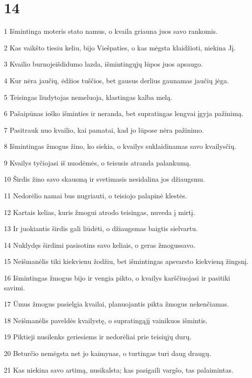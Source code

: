 \chapter{14}


\par 1 Išmintinga moteris stato namus, o kvaila griauna juos savo rankomis. 
\par 2 Kas vaikšto tiesiu keliu, bijo Viešpaties, o kas mėgsta klaidžioti, niekina Jį. 
\par 3 Kvailio burnoje­išdidumo lazda, išmintingųjų lūpos juos apsaugo. 
\par 4 Kur nėra jaučių, ėdžios tuščios, bet gausus derlius gaunamas jaučių jėga. 
\par 5 Teisingas liudytojas nemeluoja, klastingas kalba melą. 
\par 6 Pašaipūnas ieško išminties ir neranda, bet supratingas lengvai įgyja pažinimą. 
\par 7 Pasitrauk nuo kvailio, kai pamatai, kad jo lūpose nėra pažinimo. 
\par 8 Išmintingas žmogus žino, ko siekia, o kvailys suklaidinamas savo kvailysčių. 
\par 9 Kvailys tyčiojasi iš nuodėmės, o teisusis atranda palankumą. 
\par 10 Širdis žino savo skausmą ir svetimasis nesidalina jos džiaugsmu. 
\par 11 Nedorėlio namai bus nugriauti, o teisiojo palapinė klestės. 
\par 12 Kartais kelias, kuris žmogui atrodo teisingas, nuveda į mirtį. 
\par 13 Ir juokiantis širdis gali liūdėti, o džiaugsmas baigtis sielvartu. 
\par 14 Nuklydęs širdimi pasisotins savo keliais, o geras žmogus­savo. 
\par 15 Neišmanėlis tiki kiekvienu žodžiu, bet išmintingas apsvarsto kiekvieną žingsnį. 
\par 16 Išmintingas žmogus bijo ir vengia pikto, o kvailys karščiuojasi ir pasitiki savimi. 
\par 17 Ūmus žmogus pasielgia kvailai, planuojantis pikta žmogus nekenčiamas. 
\par 18 Neišmanėlis paveldės kvailystę, o supratingąjį vainikuos išmintis. 
\par 19 Piktieji nusilenks geriesiems ir nedorėliai prie teisiųjų durų. 
\par 20 Beturčio nemėgsta net jo kaimynas, o turtingas turi daug draugų. 
\par 21 Kas niekina savo artimą, nusikalsta; kas pasigaili vargšo, tas palaimintas. 
